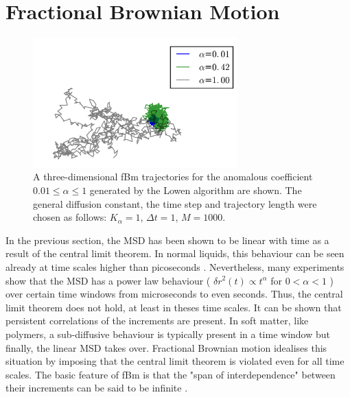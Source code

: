 \documentclass[
  a4paper,BCOR10mm,oneside,
  headsepline,footsepline,%
  fleqn,openbib
]{scrbook}
\begin{document}


\section{Fractional Brownian Motion}\label{sectionfrac}
\begin{figure}
\centering
\includegraphics[width=0.7\textwidth]{./data/trajectories_differentalpha1234.png}
\caption{A three-dimensional fBm trajectories for the anomalous coefficient $0.01\leq\alpha\leq 1$ generated by the Lowen algorithm are shown. The general diffusion constant, the time step and trajectory length were chosen as follows:  $K_{\alpha}=1$, $\Delta t=1$, $M=1000$.}
\label{alphachangetrajectory}
\end{figure}
In the previous section, the MSD has been shown to be linear with time as a result of the central limit theorem. In normal liquids, this behaviour can be seen already at time scales higher than picoseconds \cite{Hofling2013}. Nevertheless, many experiments show that the MSD has a power law behaviour ( $\delta r ^2 (t) \propto t^{\alpha}$ for  $0 < \alpha < 1$ ) over certain time windows from  microseconds to even seconds. Thus, the central limit theorem does not hold, at least in theses time scales. It can be shown that persistent correlations of the increments are present. In soft matter, like polymers, a sub-diffusive behaviour is typically present in a time window but finally, the linear MSD takes over. Fractional Brownian motion idealises this situation by imposing that the central limit theorem is violated even for all time scales. The basic feature of fBm is that the "span of interdependence" between their increments can be said to be infinite \cite{Mandelbrot1968}. \par
\end{document}
